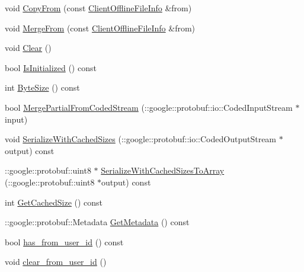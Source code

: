 \begin{DoxyCompactItemize}
\item 
void \hyperlink{class_i_m_1_1_base_define_1_1_client_offline_file_info_a48ccdfc45ee309ecf65aed3655f30489}{Copy\+From} (const \hyperlink{class_i_m_1_1_base_define_1_1_client_offline_file_info}{Client\+Offline\+File\+Info} \&from)
\item 
void \hyperlink{class_i_m_1_1_base_define_1_1_client_offline_file_info_a0b71bb33a3d03bd02d6439cbf52e6f86}{Merge\+From} (const \hyperlink{class_i_m_1_1_base_define_1_1_client_offline_file_info}{Client\+Offline\+File\+Info} \&from)
\item 
void \hyperlink{class_i_m_1_1_base_define_1_1_client_offline_file_info_a8dcfef745d2db950ccc7ebee6464ce44}{Clear} ()
\item 
bool \hyperlink{class_i_m_1_1_base_define_1_1_client_offline_file_info_a89f2c8651bf65234510de94afade45bb}{Is\+Initialized} () const 
\item 
int \hyperlink{class_i_m_1_1_base_define_1_1_client_offline_file_info_ab6a110ef417da38be6fcd642a80e779e}{Byte\+Size} () const 
\item 
bool \hyperlink{class_i_m_1_1_base_define_1_1_client_offline_file_info_a1247c391d91c0d66de9a27faef848efa}{Merge\+Partial\+From\+Coded\+Stream} (\+::google\+::protobuf\+::io\+::\+Coded\+Input\+Stream $\ast$input)
\item 
void \hyperlink{class_i_m_1_1_base_define_1_1_client_offline_file_info_a125537760123cbcc020fa13db8423ba1}{Serialize\+With\+Cached\+Sizes} (\+::google\+::protobuf\+::io\+::\+Coded\+Output\+Stream $\ast$output) const 
\item 
\+::google\+::protobuf\+::uint8 $\ast$ \hyperlink{class_i_m_1_1_base_define_1_1_client_offline_file_info_a61bcf905af3b4e392a82d9b274a04cf4}{Serialize\+With\+Cached\+Sizes\+To\+Array} (\+::google\+::protobuf\+::uint8 $\ast$output) const 
\item 
int \hyperlink{class_i_m_1_1_base_define_1_1_client_offline_file_info_a3e380395b3ab3bab461100525da4bcf7}{Get\+Cached\+Size} () const 
\item 
\+::google\+::protobuf\+::\+Metadata \hyperlink{class_i_m_1_1_base_define_1_1_client_offline_file_info_ae5e220bb36cde59670ea686da747f67c}{Get\+Metadata} () const 
\item 
bool \hyperlink{class_i_m_1_1_base_define_1_1_client_offline_file_info_a34e3d356de475d0a581e8ff7c5e55110}{has\+\_\+from\+\_\+user\+\_\+id} () const 
\item 
void \hyperlink{class_i_m_1_1_base_define_1_1_client_offline_file_info_a21ec8e962420f68ef836cbff534ee496}{clear\+\_\+from\+\_\+user\+\_\+id} ()

\end{DoxyCompactItemize}
